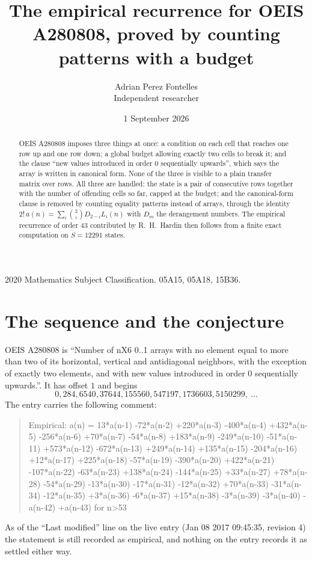 \documentclass[11pt,a4paper]{article}
\title{The empirical recurrence for OEIS A280808, proved by counting patterns with a budget}
\author{Adrian Perez Fontelles\\ \small Independent researcher}
\date{1 September 2026}
\theoremstyle{plain}
\theoremstyle{definition}
\begin{document}
\maketitle

\begin{abstract}
OEIS A280808 imposes three things at once: a condition on each cell that reaches one row up and
one row down; a global budget allowing exactly two cells to
break it; and the clause ``new values introduced in order $0$ sequentially upwards'', which
says the array is written in canonical form. None of the three is visible to a plain transfer
matrix over rows. All three are handled: the state is a pair of consecutive rows
together with the number of offending cells so far, capped at the budget; and the
canonical-form clause is removed by counting equality patterns instead of arrays, through the
identity $2!\,a(n)=\sum_i\binom{2}{i}D_{2-i}L_i(n)$ with $D_m$ the derangement
numbers. The empirical recurrence of order $43$ contributed by R.~H.~Hardin then follows
from a finite exact computation on $S=12291$ states.
\end{abstract}

\noindent\small 2020 Mathematics Subject Classification. 05A15, 05A18, 15B36.\normalsize

\section{The sequence and the conjecture}

OEIS A280808 is ``Number of nX6 0..1 arrays with no element equal to more than two of its horizontal, vertical and antidiagonal neighbors, with the exception of exactly two elements, and with new values introduced in order 0 sequentially upwards.''. It has offset $1$ and begins
\[
0, 284, 6540, 37644, 155560, 547197, 1736603, 5150299,\ \dots
\]
The entry carries the following comment:
\begin{quote}\small
Empirical: a(n) = 13*a(n-1) -72*a(n-2) +220*a(n-3) -400*a(n-4) +432*a(n-5) -256*a(n-6) +70*a(n-7) -54*a(n-8) +183*a(n-9) -249*a(n-10) -51*a(n-11) +573*a(n-12) -672*a(n-13) +249*a(n-14) +135*a(n-15) -204*a(n-16) +12*a(n-17) +225*a(n-18) -57*a(n-19) -390*a(n-20) +422*a(n-21) -107*a(n-22) -63*a(n-23) +138*a(n-24) -144*a(n-25) +33*a(n-27) +78*a(n-28) -54*a(n-29) -13*a(n-30) -17*a(n-31) -12*a(n-32) +70*a(n-33) -31*a(n-34) -12*a(n-35) +3*a(n-36) -6*a(n-37) +15*a(n-38) -3*a(n-39) -3*a(n-40) -a(n-42) +a(n-43) for n>53
\end{quote}
As of the ``Last modified'' line on the live entry (Jan 08 2017 09:45:35, revision 4) the statement is
still recorded as empirical, and nothing on the entry records it as settled either way.
\end{document}
